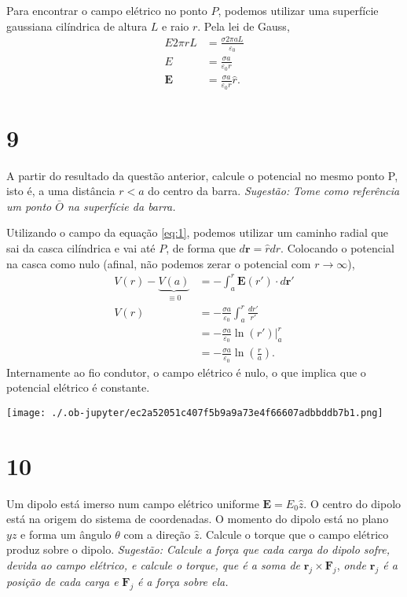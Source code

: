 \documentclass[11pt]{article}
\begin{document}
Para encontrar o campo elétrico no ponto \(P\), podemos utilizar uma
superfície gaussiana cilíndrica de altura \(L\) e raio \(r\). Pela lei de
Gauss,
\begin{align}
  E 2\pi rL &= \frac{\sigma 2\pi a L}{\varepsilon_0}\\
  E &= \frac{\sigma a}{\varepsilon_0 r}\\
  \mathbf E &= \frac{\sigma a}{\varepsilon_0 r}\hat r\label{eq:1}.
\end{align}

\section{9}
\label{sec:orgece47e6}
A partir do resultado da questão anterior, calcule o potencial no mesmo
ponto P, isto é, a uma distância \(r<a\) do centro da barra. \emph{Sugestão:}
\emph{Tome como referência um ponto \(\bar O\) na superfície da barra.}

Utilizando o campo da equação \ref{eq:1}, podemos utilizar um caminho
radial que sai da casca cilíndrica e vai até \(P\), de forma que \(d\mathbf
r = \hat r dr\). Colocando o potencial na casca como nulo (afinal, não
podemos zerar o potencial com \(r\to\infty\)), 
\begin{align}
  V(r) - \underbrace{V(a)}_{\equiv 0}
  &= -\int_a^r \mathbf E(r')\cdot d\mathbf r'\\
  V(r) &= -\frac{\sigma a}{\varepsilon_0}\int_a^r \frac{dr'}{r'}\\
  &= -\frac{\sigma a}{\varepsilon_0}\ln(r')\Big\vert_a^r\\
  &= -\frac{\sigma a}{\varepsilon_0}\ln\left(\frac{r}{a}\right).
\end{align}
Internamente ao fio condutor, o campo elétrico é nulo, o que implica que
o potencial elétrico é constante.

\begin{center}
\texttt{[image: ./.ob-jupyter/ec2a52051c407f5b9a9a73e4f66607adbbddb7b1.png]}
\end{center}

\section{10}
\label{sec:org6f1f875}
Um dipolo está imerso num campo elétrico uniforme \(\mathbf E=E_0 \hat
z\). O centro do dipolo está na origem do sistema de coordenadas. O
momento do dipolo está no plano \(yz\) e forma um ângulo \(\theta\) com a direção
\(\hat z\). Calcule o torque que o campo elétrico produz sobre o
dipolo. \emph{Sugestão: Calcule a força que cada carga do dipolo sofre, devida}
\emph{ao campo elétrico, e calcule o torque, que é a soma de} \(\mathbf r_j
\times \mathbf F_j\), \emph{onde \(\mathbf r_j\) é a posição de cada carga e} \(\mathbf
F_j\) \emph{é a força sobre ela.}
\end{document}
